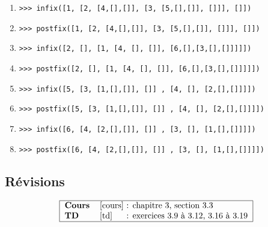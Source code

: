 \begin{enumerate}
\item \texttt{>{>}> infix([1, [2, [4,[],[]], [3, [5,[],[]], []]], []])}
\item \texttt{>{>}> postfix([1, [2, [4,[],[]], [3, [5,[],[]], []]], []])}

\item \texttt{>{>}> infix([2, [], [1, [4, [], []], [6,[],[3,[],[]]]]])}
\item \texttt{>{>}> postfix([2, [], [1, [4, [], []], [6,[],[3,[],[]]]]])}

\item \texttt{>{>}> infix([5, [3, [1,[],[]], []] , [4, [], [2,[],[]]]])}
\item \texttt{>{>}> postfix([5, [3, [1,[],[]], []] , [4, [], [2,[],[]]]])}

\item \texttt{>{>}> infix([6, [4, [2,[],[]], []] , [3, [], [1,[],[]]]])}
\item \texttt{>{>}> postfix([6, [4, [2,[],[]], []] , [3, [], [1,[],[]]]])}
\end{enumerate}

\subsection{Révisions}

$$\begin{tabular}{|ll@{ : }l|}
\hline
\textbf{Cours} & \cite{cours} & chapitre 3, section 3.3 \\
\textbf{TD}    & \cite{td}    & exercices 3.9 à 3.12, 3.16 à 3.19 \\
\hline
\end{tabular}$$

